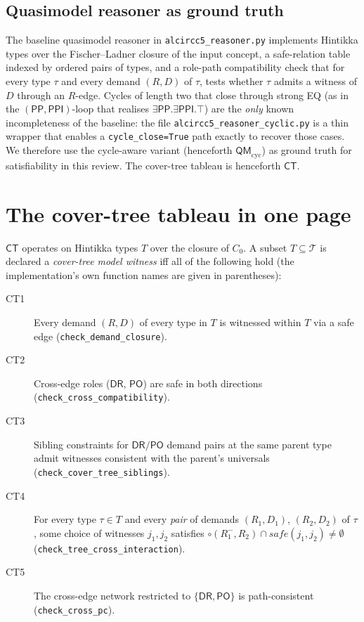 \documentclass[]{ceurart}
\newcommand{\DR}{\mathsf{DR}}
\newcommand{\PO}{\mathsf{PO}}
\newcommand{\PP}{\mathsf{PP}}
\newcommand{\PPI}{\mathsf{PPI}}
\newcommand{\comp}{\circ}
\newcommand{\inv}[1]{#1^{-}}
\theoremstyle{definition}
\theoremstyle{remark}
\begin{document}
\subsection{Quasimodel reasoner as ground truth}

The baseline quasimodel reasoner in
\verb|alcircc5_reasoner.py| implements Hintikka types over the
Fischer--Ladner closure of the input concept, a safe-relation table
indexed by ordered pairs of types, and a role-path compatibility check
that for every type $\tau$ and every demand $(R, D)$ of $\tau$, tests
whether $\tau$ admits a witness of $D$ through an $R$-edge. Cycles of
length two that close through strong EQ (as in the
$(\PP, \PPI)$-loop that realises
$\exists \PP . \exists \PPI . \top$) are the \emph{only} known
incompleteness of the baseline: the file
\verb|alcircc5_reasoner_cyclic.py| is a thin wrapper that enables a
\verb|cycle_close=True| path exactly to recover those cases. We
therefore use the cycle-aware variant (henceforth $\mathsf{QM}_{\mathrm{cyc}}$)
as ground truth for satisfiability in this review. The cover-tree
tableau is henceforth $\mathsf{CT}$.

\section{The cover-tree tableau in one page}
\label{sec:ct}

$\mathsf{CT}$ operates on Hintikka types $T$ over the closure of
$C_0$. A subset $T \subseteq \mathcal{T}$ is declared a
\emph{cover-tree model witness} iff all of the following hold (the
implementation's own function names are given in parentheses):
\begin{description}
  \item[CT1] Every demand $(R, D)$ of every type in $T$ is witnessed
    within $T$ via a safe edge
    (\texttt{check\_demand\_closure}).
  \item[CT2] Cross-edge roles ($\DR$, $\PO$) are safe in both directions
    (\texttt{check\_cross\_compatibility}).
  \item[CT3] Sibling constraints for $\DR/\PO$ demand pairs
    at the same parent type admit witnesses consistent with the
    parent's universals
    (\texttt{check\_cover\_tree\_siblings}).
  \item[CT4] For every type $\tau \in T$ and every \emph{pair} of
    demands $(R_1, D_1)$, $(R_2, D_2)$ of $\tau$, some choice of
    witnesses $j_1, j_2$ satisfies
    $\comp(\inv{R_1}, R_2) \cap \mathit{safe}(j_1, j_2) \neq
    \emptyset$
    (\texttt{check\_tree\_cross\_interaction}).
  \item[CT5] The cross-edge network restricted to $\{\DR, \PO\}$ is
    path-consistent (\texttt{check\_cross\_pc}).
\end{description}
\end{document}
